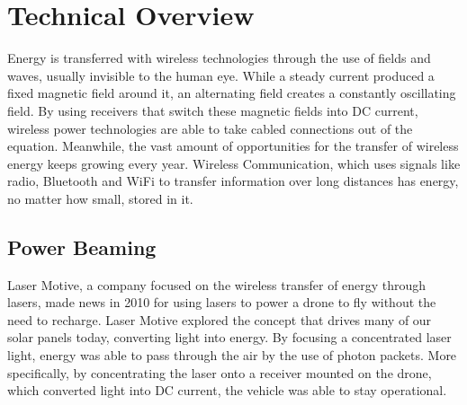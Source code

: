 \documentclass{article}
\begin{document}
\section {Technical Overview}
Energy is transferred with wireless technologies through the use of fields and waves, usually invisible to the human eye. While a steady current produced a fixed magnetic field around it, an alternating field creates a constantly oscillating field. By using receivers that switch these magnetic fields into DC current, wireless power technologies are able to take cabled connections out of the equation. Meanwhile, the vast amount of opportunities for the transfer of wireless energy keeps growing every year. Wireless Communication, which uses signals like radio, Bluetooth and WiFi to transfer information over long distances has energy, no matter how small, stored in it.

\subsection {Power Beaming}
Laser Motive, a company focused on the wireless transfer of energy through lasers, made news in 2010 for using lasers to power a drone to fly without the need to recharge. Laser Motive explored the concept that drives many of our solar panels today, converting light into energy. By focusing a concentrated laser light, energy was able to pass through the air by the use of photon packets. More specifically, by concentrating the laser onto a receiver mounted on the drone, which converted light into DC current, the vehicle was able to stay operational.
\end{document}
